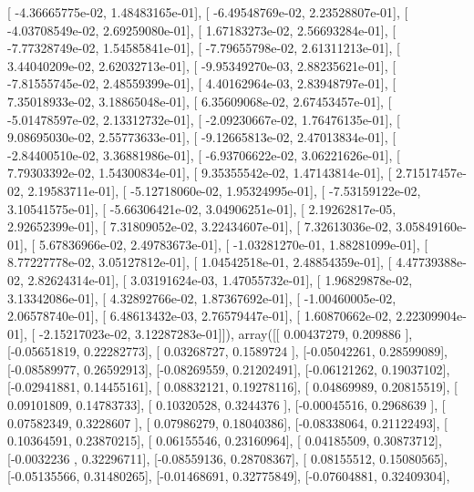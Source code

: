 \documentclass{article}
\begin{document}
       [ -4.36665775e-02,   1.48483165e-01],
       [ -6.49548769e-02,   2.23528807e-01],
       [ -4.03708549e-02,   2.69259080e-01],
       [  1.67183273e-02,   2.56693284e-01],
       [ -7.77328749e-02,   1.54585841e-01],
       [ -7.79655798e-02,   2.61311213e-01],
       [  3.44040209e-02,   2.62032713e-01],
       [ -9.95349270e-03,   2.88235621e-01],
       [ -7.81555745e-02,   2.48559399e-01],
       [  4.40162964e-03,   2.83948797e-01],
       [  7.35018933e-02,   3.18865048e-01],
       [  6.35609068e-02,   2.67453457e-01],
       [ -5.01478597e-02,   2.13312732e-01],
       [ -2.09230667e-02,   1.76476135e-01],
       [  9.08695030e-02,   2.55773633e-01],
       [ -9.12665813e-02,   2.47013834e-01],
       [ -2.84400510e-02,   3.36881986e-01],
       [ -6.93706622e-02,   3.06221626e-01],
       [  7.79303392e-02,   1.54300834e-01],
       [  9.35355542e-02,   1.47143814e-01],
       [  2.71517457e-02,   2.19583711e-01],
       [ -5.12718060e-02,   1.95324995e-01],
       [ -7.53159122e-02,   3.10541575e-01],
       [ -5.66306421e-02,   3.04906251e-01],
       [  2.19262817e-05,   2.92652399e-01],
       [  7.31809052e-02,   3.22434607e-01],
       [  7.32613036e-02,   3.05849160e-01],
       [  5.67836966e-02,   2.49783673e-01],
       [ -1.03281270e-01,   1.88281099e-01],
       [  8.77227778e-02,   3.05127812e-01],
       [  1.04542518e-01,   2.48854359e-01],
       [  4.47739388e-02,   2.82624314e-01],
       [  3.03191624e-03,   1.47055732e-01],
       [  1.96829878e-02,   3.13342086e-01],
       [  4.32892766e-02,   1.87367692e-01],
       [ -1.00460005e-02,   2.06578740e-01],
       [  6.48613432e-03,   2.76579447e-01],
       [  1.60870662e-02,   2.22309904e-01],
       [ -2.15217023e-02,   3.12287283e-01]]), array([[ 0.00437279,  0.209886  ],
       [-0.05651819,  0.22282773],
       [ 0.03268727,  0.1589724 ],
       [-0.05042261,  0.28599089],
       [-0.08589977,  0.26592913],
       [-0.08269559,  0.21202491],
       [-0.06121262,  0.19037102],
       [-0.02941881,  0.14455161],
       [ 0.08832121,  0.19278116],
       [ 0.04869989,  0.20815519],
       [ 0.09101809,  0.14783733],
       [ 0.10320528,  0.3244376 ],
       [-0.00045516,  0.2968639 ],
       [ 0.07582349,  0.3228607 ],
       [ 0.07986279,  0.18040386],
       [-0.08338064,  0.21122493],
       [ 0.10364591,  0.23870215],
       [ 0.06155546,  0.23160964],
       [ 0.04185509,  0.30873712],
       [-0.0032236 ,  0.32296711],
       [-0.08559136,  0.28708367],
       [ 0.08155512,  0.15080565],
       [-0.05135566,  0.31480265],
       [-0.01468691,  0.32775849],
       [-0.07604881,  0.32409304],
\end{document}
